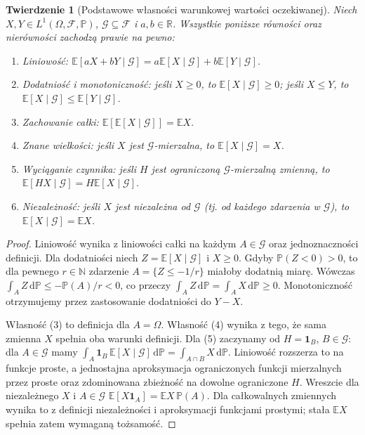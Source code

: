 \documentclass[11pt,a4paper,oneside]{report}
\numberwithin{equation}{chapter}
\theoremstyle{plain}
\newtheorem{twierdzenie}{Twierdzenie}[chapter]
\theoremstyle{definition}
\theoremstyle{remark}
\newcommand{\R}{\mathbb{R}}
\newcommand{\N}{\mathbb{N}}
\newcommand{\Prob}{\mathbb{P}}
\newcommand{\E}{\mathbb{E}}
\newcommand{\ind}[1]{\mathbf{1}_{#1}}
\newcommand{\dd}{\mathrm{d}}
\begin{document}
\begin{twierdzenie}[Podstawowe własności warunkowej wartości oczekiwanej]
Niech $X,Y\in L^1(\Omega,\mathcal F,\Prob)$,
$\mathcal G\subseteq\mathcal F$ i $a,b\in\R$.
Wszystkie poniższe równości oraz nierówności zachodzą
prawie na pewno:
\begin{enumerate}
\item \emph{Liniowość:}
$\E[aX+bY\mid\mathcal G]=a\E[X\mid\mathcal G]+b\E[Y\mid\mathcal G]$.
\item \emph{Dodatniość i monotoniczność:} jeśli $X\geq0$,
to $\E[X\mid\mathcal G]\geq0$; jeśli $X\leq Y$,
to $\E[X\mid\mathcal G]\leq\E[Y\mid\mathcal G]$.
\item \emph{Zachowanie całki:}
$\E[\E[X\mid\mathcal G]]=\E X$.
\item \emph{Znane wielkości:} jeśli $X$ jest
$\mathcal G$-mierzalna, to
$\E[X\mid\mathcal G]=X$.
\item \emph{Wyciąganie czynnika:} jeśli $H$ jest
ograniczoną $\mathcal G$-mierzalną zmienną, to
$\E[HX\mid\mathcal G]=H\E[X\mid\mathcal G]$.
\item \emph{Niezależność:} jeśli $X$ jest niezależna
od $\mathcal G$ (tj. od każdego zdarzenia
w $\mathcal G$), to $\E[X\mid\mathcal G]=\E X$.
\end{enumerate}
\end{twierdzenie}
\begin{proof}
Liniowość wynika z liniowości całki na każdym
$A\in\mathcal G$ oraz jednoznaczności definicji.
Dla dodatniości niech $Z=\E[X\mid\mathcal G]$
i $X\geq0$. Gdyby $\Prob(Z<0)>0$, to dla
pewnego $r\in\N$ zdarzenie $A=\{Z\leq-1/r\}$
miałoby dodatnią miarę. Wówczas
$\int_A Z\,\dd\Prob\leq-\Prob(A)/r<0$,
co przeczy $\int_AZ\,\dd\Prob=\int_AX\,\dd\Prob\geq0$.
Monotoniczność otrzymujemy przez zastosowanie
dodatniości do $Y-X$.

Własność (3) to definicja dla $A=\Omega$.
Własność (4) wynika z tego, że sama zmienna $X$
spełnia oba warunki definicji. Dla (5) zaczynamy
od $H=\ind B$, $B\in\mathcal G$: dla
$A\in\mathcal G$ mamy
$\int_A\ind B\,\E[X\mid\mathcal G] \,\dd\Prob
=\int_{A\cap B}X\,\dd\Prob$.
Liniowość rozszerza to na funkcje proste, a
jednostajna aproksymacja ograniczonych funkcji
mierzalnych przez proste oraz zdominowana zbieżność
na dowolne ograniczone $H$.
Wreszcie dla niezależnego $X$ i $A\in\mathcal G$
$\E[X\ind A]=\E X\,\Prob(A)$.
Dla całkowalnych zmiennych wynika to z definicji
niezależności i aproksymacji funkcjami prostymi;
stała $\E X$ spełnia zatem wymaganą tożsamość.
\end{proof}
\end{document}

